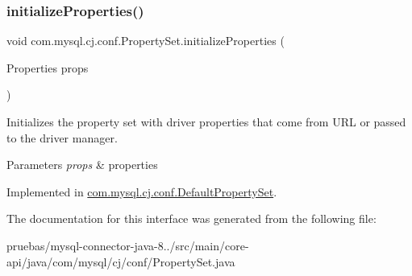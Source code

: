 \subsubsection{\texorpdfstring{initialize\+Properties()}{initializeProperties()}}
{\footnotesize\ttfamily void com.\+mysql.\+cj.\+conf.\+Property\+Set.\+initialize\+Properties (\begin{DoxyParamCaption}\item[{Properties}]{props }\end{DoxyParamCaption})}

Initializes the property set with driver properties that come from U\+RL or passed to the driver manager.


\begin{DoxyParams}{Parameters}
{\em props} & properties \\
\hline
\end{DoxyParams}


Implemented in \mbox{\hyperlink{classcom_1_1mysql_1_1cj_1_1conf_1_1_default_property_set_aca8a98e7e0fa72d07fde37a0e7b03fbe}{com.\+mysql.\+cj.\+conf.\+Default\+Property\+Set}}.



The documentation for this interface was generated from the following file\+:\begin{DoxyCompactItemize}
\item 
pruebas/mysql-\/connector-\/java-\/8../src/main/core-\/api/java/com/mysql/cj/conf/Property\+Set.\+java\end{DoxyCompactItemize}

